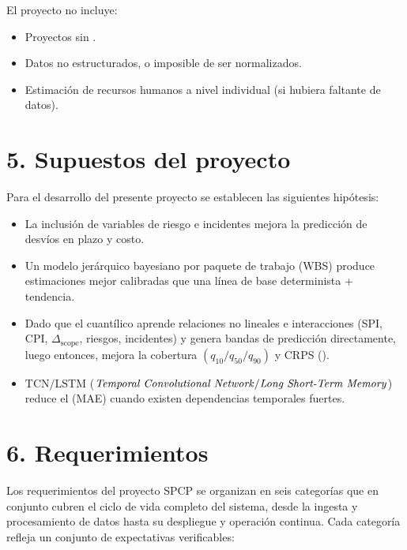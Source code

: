 \documentclass[12pt]
{charter}
\begin{document}
El proyecto no incluye:
\begin{itemize}
	\item Proyectos sin .
	\item Datos no estructurados, o imposible de ser normalizados.
	\item Estimación de recursos humanos a nivel individual (si hubiera faltante de datos). 
\end{itemize}

\section{5. Supuestos del proyecto}
\label{sec:supuestos}

Para el desarrollo del presente proyecto se establecen las siguientes hipótesis:

\begin{itemize}
	\item La inclusión de variables de riesgo e incidentes mejora la predicción de desvíos en plazo y costo.
	\item Un modelo jerárquico bayesiano por paquete de trabajo (WBS) produce estimaciones mejor calibradas que una línea de base determinista + tendencia.
	\item Dado que el  cuantílico aprende relaciones no lineales e interacciones (SPI, CPI, $\Delta_{\text{scope}}$, riesgos, incidentes) y genera bandas de predicción directamente, luego entonces, mejora la cobertura $(q_{10}/q_{50}/q_{90})$ y CRPS ().
	\item $\text{TCN} / \text{LSTM}$ ($\text{\textit{Temporal Convolutional Network}} / \text{\textit{Long Short-Term Memory}}$) reduce el  (MAE) cuando existen dependencias temporales fuertes.
\end{itemize}


\section{6. Requerimientos}
\label{sec:requerimientos}

Los requerimientos del proyecto SPCP se organizan en seis categorías que en conjunto cubren el ciclo de vida completo del sistema, desde la ingesta y procesamiento de datos hasta su despliegue y operación continua. 
Cada categoría refleja un conjunto de expectativas verificables: 
\end{document}
